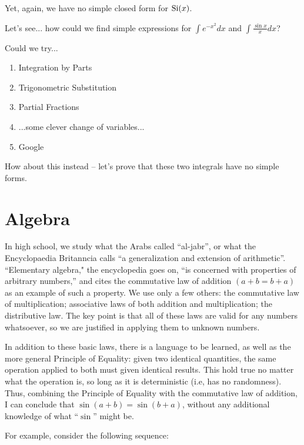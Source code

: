 Yet, again, we have no simple closed form for ${\rm Si}(x)$.

Let's see... how could we find simple expressions for $\int e^{-x^2} dx$ and $\int \frac{\sin x}{x} dx$?

Could we try...

\begin{enumerate}
\item Integration by Parts
\item Trigonometric Substitution
\item Partial Fractions
\item ...some clever change of variables...
\item Google
\end{enumerate}

How about this instead -- let's prove that these two integrals have no simple forms.


\vfill\eject
\section{Algebra}

In high school, we study what the Arabs called ``al-jabr'', or what
the Encyclopaedia Britanncia calls ``a generalization and extension of
arithmetic''.  ``Elementary algebra," the encyclopedia goes on, ``is
concerned with properties of arbitrary numbers,'' and cites the
commutative law of addition $(a+b=b+a)$ as an example of such a
property.  We use only a few others: the commutative law of
multiplication; associative laws of both addition and multiplication;
the distributive law.  The key point is that all of these laws are
valid for any numbers whatsoever, so we are justified in applying them
to unknown numbers.

In addition to these basic laws, there is a language to be learned, as
well as the more general Principle of Equality: given two identical
quantities, the same operation applied to both must given identical
results.  This hold true no matter what the operation is, so long as
it is deterministic (i.e, has no randomness).  Thus, combining the
Principle of Equality with the commutative law of addition, I can
conclude that $\sin(a+b)=\sin(b+a)$, without any additional knowledge of
what ``$\sin$'' might be.

For example, consider the following sequence:

